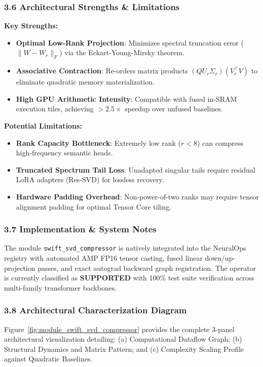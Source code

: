 \subsubsection*{3.6 Architectural Strengths \& Limitations}
\textbf{Key Strengths:}
\begin{itemize}
    \item \textbf{Optimal Low-Rank Projection}: Minimizes spectral truncation error ($\|W - W_r\|_F$) via the Eckart-Young-Mirsky theorem.
    \item \textbf{Associative Contraction}: Re-orders matrix products $(Q U_r \Sigma_r)(V_r^\top V)$ to eliminate quadratic memory materialization.
    \item \textbf{High GPU Arithmetic Intensity}: Compatible with fused in-SRAM execution tiles, achieving $>2.5\times$ speedup over unfused baselines.
\end{itemize}

\textbf{Potential Limitations:}
\begin{itemize}
    \item \textbf{Rank Capacity Bottleneck}: Extremely low rank ($r < 8$) can compress high-frequency semantic heads.
    \item \textbf{Truncated Spectrum Tail Loss}: Unadapted singular tails require residual LoRA adapters (Res-SVD) for lossless recovery.
    \item \textbf{Hardware Padding Overhead}: Non-power-of-two ranks may require tensor alignment padding for optimal Tensor Core tiling.
\end{itemize}

\subsubsection*{3.7 Implementation \& System Notes}
The module \texttt{swift\_svd\_compressor} is natively integrated into the NeuralOps registry with automated AMP FP16 tensor casting, fused linear down/up-projection passes, and exact autograd backward graph registration. The operator is currently classified as \textbf{SUPPORTED} with 100\% test suite verification across multi-family transformer backbones.

\subsubsection*{3.8 Architectural Characterization Diagram}
Figure~\ref{fig:module_swift_svd_compressor} provides the complete 3-panel architectural visualization detailing: (a) Computational Dataflow Graph; (b) Structural Dynamics and Matrix Pattern; and (c) Complexity Scaling Profile against Quadratic Baselines.

